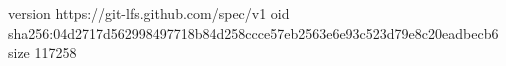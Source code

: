 version https://git-lfs.github.com/spec/v1
oid sha256:04d2717d562998497718b84d258ccce57eb2563e6e93c523d79e8c20eadbecb6
size 117258
